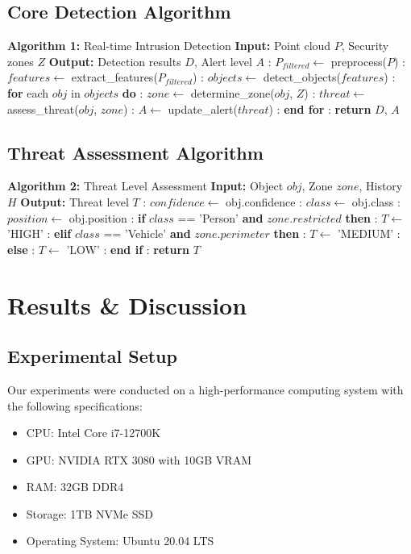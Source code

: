 \documentclass[conference]{IEEEtran}
\begin{document}
\subsection{Core Detection Algorithm}

\begin{algorithmic}
\STATE \textbf{Algorithm 1:} Real-time Intrusion Detection
\STATE \textbf{Input:} Point cloud $P$, Security zones $Z$
\STATE \textbf{Output:} Detection results $D$, Alert level $A$
\STATE
{}: $P_{filtered} \leftarrow$ preprocess($P$)
: $features \leftarrow$ extract\_features($P_{filtered}$)
: $objects \leftarrow$ detect\_objects($features$)
: \textbf{for} each $obj$ in $objects$ \textbf{do}
: \quad $zone \leftarrow$ determine\_zone($obj$, $Z$)
: \quad $threat \leftarrow$ assess\_threat($obj$, $zone$)
: \quad $A \leftarrow$ update\_alert($threat$)
: \textbf{end for}
: \textbf{return} $D$, $A$
\end{algorithmic}

\subsection{Threat Assessment Algorithm}

\begin{algorithmic}
\STATE \textbf{Algorithm 2:} Threat Level Assessment
\STATE \textbf{Input:} Object $obj$, Zone $zone$, History $H$
\STATE \textbf{Output:} Threat level $T$
\STATE
{}: $confidence \leftarrow$ obj.confidence
: $class \leftarrow$ obj.class
: $position \leftarrow$ obj.position
: \textbf{if} $class$ == 'Person' \textbf{and} $zone.restricted$ \textbf{then}
: \quad $T \leftarrow$ 'HIGH'
: \textbf{elif} $class$ == 'Vehicle' \textbf{and} $zone.perimeter$ \textbf{then}
: \quad $T \leftarrow$ 'MEDIUM'
: \textbf{else}
: \quad $T \leftarrow$ 'LOW'
: \textbf{end if}
: \textbf{return} $T$
\end{algorithmic}

\section{Results \& Discussion}

\subsection{Experimental Setup}
Our experiments were conducted on a high-performance computing system with the following specifications:
\begin{itemize}
\item CPU: Intel Core i7-12700K
\item GPU: NVIDIA RTX 3080 with 10GB VRAM
\item RAM: 32GB DDR4
\item Storage: 1TB NVMe SSD
\item Operating System: Ubuntu 20.04 LTS
\end{itemize}
\end{document}
